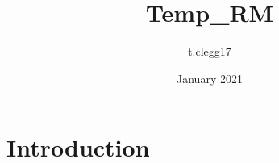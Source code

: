 \documentclass{article}
\title{Temp_RM}
\author{t.clegg17 }
\date{January 2021}
\begin{document}
\maketitle

\section{Introduction}
\end{document}
